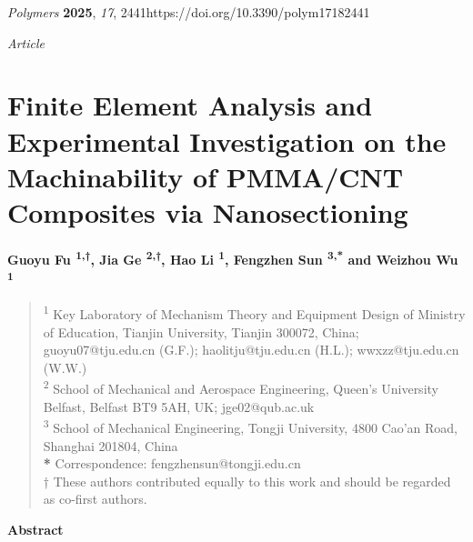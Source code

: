 \documentclass{article}
\begin{document}

\noindent \emph{Polymers} \textbf{2025}, \emph{17}, 2441\quad https://doi.org/10.3390/polym17182441\par

\noindent\emph{Article}

\section*{Finite Element Analysis and Experimental Investigation on the Machinability of PMMA/CNT Composites via Nanosectioning}

\noindent\textbf{Guoyu Fu \textsuperscript{1,†}, Jia Ge \textsuperscript{2,†}, Hao Li \textsuperscript{1}, Fengzhen Sun \textsuperscript{3,*} and Weizhou Wu \textsuperscript{1}}

\begin{quote}\small
\noindent\textsuperscript{1} Key Laboratory of Mechanism Theory and Equipment Design of Ministry of Education, Tianjin University, Tianjin 300072, China; guoyu07@tju.edu.cn (G.F.); haolitju@tju.edu.cn (H.L.); wwxzz@tju.edu.cn (W.W.)\\
\textsuperscript{2} School of Mechanical and Aerospace Engineering, Queen’s University Belfast, Belfast BT9 5AH, UK; jge02@qub.ac.uk\\
\textsuperscript{3} School of Mechanical Engineering, Tongji University, 4800 Cao’an Road, Shanghai 201804, China\\
\textbf{*} Correspondence: fengzhensun@tongji.edu.cn\\
† These authors contributed equally to this work and should be regarded as co-first authors.
\end{quote}

\noindent\textbf{Abstract}
\end{document}
